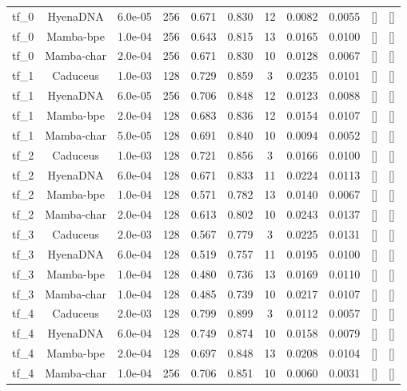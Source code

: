 \begin{landscape}
\begin{table}[]
\begin{tabular}{@{}lcccccccccc@{}}
tf\_0 & HyenaDNA & 6.0e-05 & 256 & 0.671 & 0.830 & 12 & 0.0082 & 0.0055 & [] & [] \\
tf\_0 & Mamba-bpe & 1.0e-04 & 256 & 0.643 & 0.815 & 13 & 0.0165 & 0.0100 & [] & [] \\
tf\_0 & Mamba-char & 2.0e-04 & 256 & 0.671 & 0.830 & 10 & 0.0128 & 0.0067 & [] & [] \\
tf\_1 & Caduceus & 1.0e-03 & 128 & 0.729 & 0.859 & 3 & 0.0235 & 0.0101 & [] & [] \\
tf\_1 & HyenaDNA & 6.0e-05 & 256 & 0.706 & 0.848 & 12 & 0.0123 & 0.0088 & [] & [] \\
tf\_1 & Mamba-bpe & 2.0e-04 & 128 & 0.683 & 0.836 & 12 & 0.0154 & 0.0107 & [] & [] \\
tf\_1 & Mamba-char & 5.0e-05 & 128 & 0.691 & 0.840 & 10 & 0.0094 & 0.0052 & [] & [] \\
tf\_2 & Caduceus & 1.0e-03 & 128 & 0.721 & 0.856 & 3 & 0.0166 & 0.0100 & [] & [] \\
tf\_2 & HyenaDNA & 6.0e-04 & 128 & 0.671 & 0.833 & 11 & 0.0224 & 0.0113 & [] & [] \\
tf\_2 & Mamba-bpe & 1.0e-04 & 128 & 0.571 & 0.782 & 13 & 0.0140 & 0.0067 & [] & [] \\
tf\_2 & Mamba-char & 2.0e-04 & 128 & 0.613 & 0.802 & 10 & 0.0243 & 0.0137 & [] & [] \\
tf\_3 & Caduceus & 2.0e-03 & 128 & 0.567 & 0.779 & 3 & 0.0225 & 0.0131 & [] & [] \\
tf\_3 & HyenaDNA & 6.0e-04 & 128 & 0.519 & 0.757 & 11 & 0.0195 & 0.0100 & [] & [] \\
tf\_3 & Mamba-bpe & 1.0e-04 & 128 & 0.480 & 0.736 & 13 & 0.0169 & 0.0110 & [] & [] \\
tf\_3 & Mamba-char & 1.0e-04 & 128 & 0.485 & 0.739 & 10 & 0.0217 & 0.0107 & [] & [] \\
tf\_4 & Caduceus & 2.0e-03 & 128 & 0.799 & 0.899 & 3 & 0.0112 & 0.0057 & [] & [] \\
tf\_4 & HyenaDNA & 6.0e-04 & 128 & 0.749 & 0.874 & 10 & 0.0158 & 0.0079 & [] & [] \\
tf\_4 & Mamba-bpe & 2.0e-04 & 128 & 0.697 & 0.848 & 13 & 0.0208 & 0.0104 & [] & [] \\
tf\_4 & Mamba-char & 1.0e-04 & 256 & 0.706 & 0.851 & 10 & 0.0060 & 0.0031 & [] & [] \\
\bottomrule
\end{tabular}
\end{table}
\end{landscape}